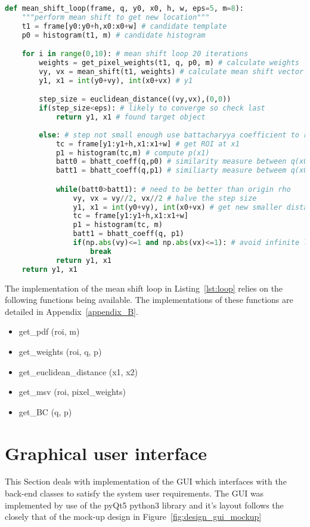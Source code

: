 \begin{lstlisting}[language=Python, caption={Mean Shift Loop}, captionpos=b, label={lst:loop}]
def mean_shift_loop(frame, q, y0, x0, h, w, eps=5, m=8):
    """perform mean shift to get new location"""
    t1 = frame[y0:y0+h,x0:x0+w] # candidate template
    p0 = histogram(t1, m) # candidate histogram

    for i in range(0,10): # mean shift loop 20 iterations
        weights = get_pixel_weights(t1, q, p0, m) # calculate weights
        vy, vx = mean_shift(t1, weights) # calculate mean shift vector
        y1, x1 = int(y0+vy), int(x0+vx) # y1

        step_size = euclidean_distance((vy,vx),(0,0))
        if(step_size<eps): # likely to converge so check last
            return y1, x1 # found target object
            
        else: # step not small enough use battacharyya coefficient to refine step
            tc = frame[y1:y1+h,x1:x1+w] # get ROI at x1
            p1 = histogram(tc,m) # compute p(x1)
            batt0 = bhatt_coeff(q,p0) # similarity measure between q(x0) and p(x0) 
            batt1 = bhatt_coeff(q,p1) # similiarty measure betweem q(x0) and p(x1)

            while(batt0>batt1): # need to be better than origin rho
                vy, vx = vy//2, vx//2 # halve the step size
                y1, x1 = int(y0+vy), int(x0+vx) # get new smaller distance 
                tc = frame[y1:y1+h,x1:x1+w]
                p1 = histogram(tc, m)
                batt1 = bhatt_coeff(q, p1)
                if(np.abs(vy)<=1 and np.abs(vx)<=1): # avoid infinite loop
                    break
            return y1, x1
    return y1, x1
\end{lstlisting}

The implementation of the mean shift loop in Listing~\ref{lst:loop} relies on
the following functions being available. The implementations of these functions
are detailed in Appendix~\ref{appendix_B}.
\begin{itemize}
    \item get\_pdf (roi, m)
    \item get\_weights (roi, q, p)
    \item get\_euclidean\_distance (x1, x2)
    \item get\_msv (roi, pixel\_weights)
    \item get\_BC (q, p)
\end{itemize}

\section{Graphical user interface}
This Section deals with implementation of the GUI which interfaces with the
back-end classes to satisfy the system user requirements.  The GUI was
implemented by use of the pyQt5 python3 library and it's layout follows the
closely that of the mock-up design in Figure~\ref{fig:design_gui_mockup}

